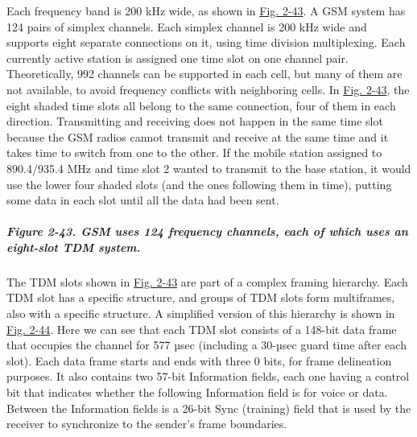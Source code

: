 \documentclass[b5paper,11pt]{memoir}
\begin{document}
Each frequency band is 200 kHz wide, as shown in
\protect\hyperlink{0130661023_ch02lev1sec6.htmlux5cux23ch02fig43}{Fig.
2-43}. A GSM system has 124 pairs of simplex channels. Each simplex
channel is 200 kHz wide and supports eight separate connections on it,
using time division multiplexing. Each currently active station is
assigned one time slot on one channel pair. Theoretically, 992 channels
can be supported in each cell, but many of them are not available, to
avoid frequency conflicts with neighboring cells. In
\protect\hyperlink{0130661023_ch02lev1sec6.htmlux5cux23ch02fig43}{Fig.
2-43}, the eight shaded time slots all belong to the same connection,
four of them in each direction. Transmitting and receiving does not
happen in the same time slot because the GSM radios cannot transmit and
receive at the same time and it takes time to switch from one to the
other. If the mobile station assigned to 890.4/935.4 MHz and time slot 2
wanted to transmit to the base station, it would use the lower four
shaded slots (and the ones following them in time), putting some data in
each slot until all the data had been sent.

\subparagraph[Figure 2-43. GSM uses 124 frequency channels, each of
which uses an eight-slot TDM
system.]{\texorpdfstring{\protect\hypertarget{0130661023_ch02lev1sec6.htmlux5cux23ch02fig43}{}{}Figure
2-43. GSM uses 124 frequency channels, each of which uses an eight-slot
TDM
system.}{Figure 2-43. GSM uses 124 frequency channels, each of which uses an eight-slot TDM system.}}


The TDM slots shown in
\protect\hyperlink{0130661023_ch02lev1sec6.htmlux5cux23ch02fig43}{Fig.
2-43} are part of a complex framing hierarchy. Each TDM slot has a
specific structure, and groups of TDM slots form multiframes, also with
a specific structure. A simplified version of this hierarchy is shown in
\protect\hyperlink{0130661023_ch02lev1sec6.htmlux5cux23ch02fig44}{Fig.
2-44}. Here we can see that each TDM slot consists of a 148-bit data
frame that occupies the channel for 577 µsec (including a 30-µsec guard
time after each slot). Each data frame starts and ends with three 0
bits, for frame delineation purposes. It also contains two 57-bit
{Information} fields, each one having a control bit that indicates
whether the following {Information} field is for voice or data. Between
the {Information} fields is a 26-bit {Sync} (training) field that is
used by the receiver to synchronize to the sender's frame boundaries.
\end{document}
